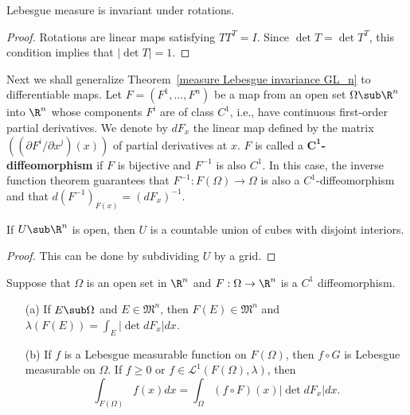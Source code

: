 \begin{corollary}\label{measure Lebesgue invariance rotation}
Lebesgue measure is invariant under rotations.
\end{corollary}
\begin{proof}
Rotations are linear maps satisfying $TT^T=I$. Since $\det T=\det T^T$, this condition implies that $|\det T|=1$.
\end{proof}
Next we shall generalize Theorem~\ref{measure Lebesgue invariance GL_n} to differentiable maps. Let $F=(F^1,\dots,F^n)$ be a map from an open set $\Omega\sub\R^n$ into $\R^n$ whose components $F^i$ are of class $C^1$, i.e., have continuous first-order partial derivatives. We denote by $dF_x$ the linear map defined by the matrix $((\partial F^i/\partial x^j)(x))$ of partial derivatives at $x$. $F$ is called a \textbf{$\bm{C^1}$-diffeomorphism} if $F$ is bijective and $F^{-1}$ is also $C^1$. In this case, the inverse function theorem guarantees that $F^{-1}:F(\Omega)\to\Omega$ is also a $C^1$-diffeomorphism and that $d(F^{-1})_{F(x)}=(dF_{x})^{-1}$.
\begin{lemma}
If $U\sub\R^n$ is open, then $U$ is a countable union of cubes with disjoint interiors.
\end{lemma}
\begin{proof}
This can be done by subdividing $U$ by a grid.
\end{proof}
\begin{theorem}\label{measure Lebesgue invariance diffeomorphism}
Suppose that $\Omega$ is an open set in $\R^n$ and $F:\Omega\to\R^n$ is a $C^1$ diffeomorphism.
\begin{itemize}
\item[(a)] If $E\sub\Omega$ and $E\in\mathfrak{M}^n$, then $F(E)\in\mathfrak{M}^n$ and $\lambda(F(E))=\int_E|\det dF_x|dx$.
\item[(b)] If $f$ is a Lebesgue measurable function on $F(\Omega)$, then $f\circ G$ is Lebesgue measurable on $\Omega$. If $f\geq 0$ or $f\in\mathcal{L}^1(F(\Omega),\lambda)$, then
\[\int_{F(\Omega)}f(x)dx=\int_\Omega (f\circ F)(x)|\det dF_x|dx.\] 
\end{itemize}
\end{theorem}
